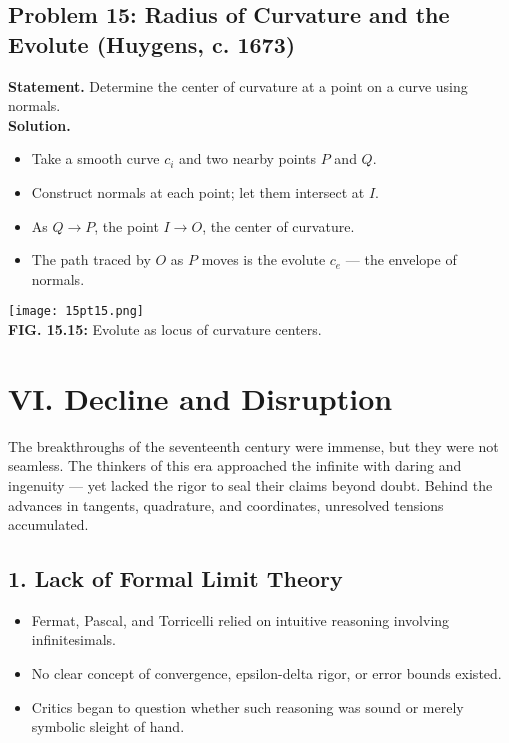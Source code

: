 \documentclass[9pt]{article}
\begin{document}
\newpage

\subsection*{Problem 15: Radius of Curvature and the Evolute (Huygens, c. 1673)}
\textbf{Statement.} Determine the center of curvature at a point on a curve using normals. \\
\textbf{Solution.}
\begin{itemize}
  \item Take a smooth curve \( c_i \) and two nearby points \( P \) and \( Q \).
  \item Construct normals at each point; let them intersect at \( I \).
  \item As \( Q \to P \), the point \( I \to O \), the center of curvature.
  \item The path traced by \( O \) as \( P \) moves is the evolute \( c_e \) — the envelope of normals.
\end{itemize}
\begin{center}
\texttt{[image: 15pt15.png]} \\
\textbf{FIG. 15.15:} Evolute as locus of curvature centers.
\end{center}

\newpage

\section*{VI. Decline and Disruption}

The breakthroughs of the seventeenth century were immense, but they were not seamless. The thinkers of this era approached the infinite with daring and ingenuity — yet lacked the rigor to seal their claims beyond doubt. Behind the advances in tangents, quadrature, and coordinates, unresolved tensions accumulated.

\subsection*{1. Lack of Formal Limit Theory}
\begin{itemize}
  \item Fermat, Pascal, and Torricelli relied on intuitive reasoning involving infinitesimals.
  \item No clear concept of convergence, epsilon-delta rigor, or error bounds existed.
  \item Critics began to question whether such reasoning was sound or merely symbolic sleight of hand.
\end{itemize}
\end{document}
